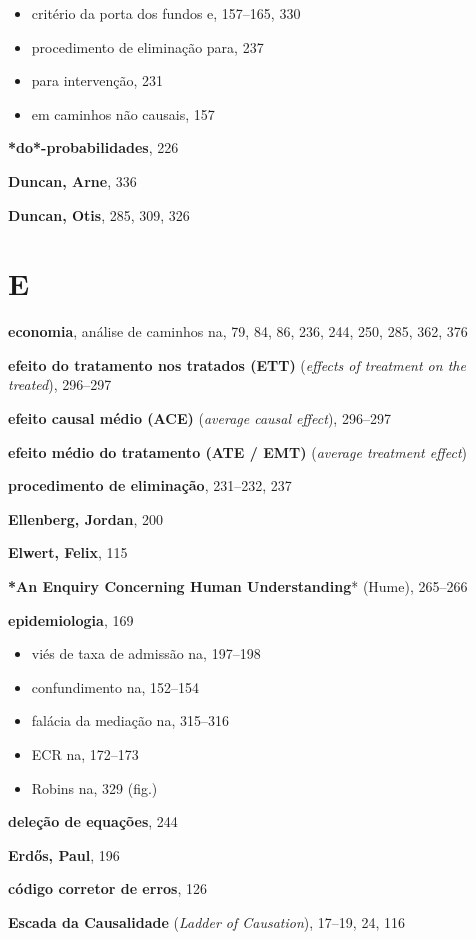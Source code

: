 \documentclass[11pt,a5paper,twoside]{book}
\begin{document}
\begin{itemize}
\item critério da porta dos fundos e, 157–165, 330
\item procedimento de eliminação para, 237
\item para intervenção, 231
\item em caminhos não causais, 157
\end{itemize}
\textbf{*do*-probabilidades}, 226

\textbf{Duncan, Arne}, 336

\textbf{Duncan, Otis}, 285, 309, 326

\section{E}
\textbf{economia}, análise de caminhos na, 79, 84, 86, 236, 244, 250, 285, 362, 376

\textbf{efeito do tratamento nos tratados (ETT)} (\textit{effects of treatment on the treated}), 296–297

\textbf{efeito causal médio (ACE)} (\textit{average causal effect}), 296–297

\textbf{efeito médio do tratamento (ATE / EMT)} (\textit{average treatment effect})

\textbf{procedimento de eliminação}, 231–232, 237

\textbf{Ellenberg, Jordan}, 200

\textbf{Elwert, Felix}, 115

\textbf{*An Enquiry Concerning Human Understanding}* (Hume), 265–266

\textbf{epidemiologia}, 169

\begin{itemize}
\item viés de taxa de admissão na, 197–198
\item confundimento na, 152–154
\item falácia da mediação na, 315–316
\item ECR na, 172–173
\item Robins na, 329 (fig.)
\end{itemize}
\textbf{deleção de equações}, 244

\textbf{Erdős, Paul}, 196

\textbf{código corretor de erros}, 126

\textbf{Escada da Causalidade} (\textit{Ladder of Causation}), 17–19, 24, 116
\end{document}
